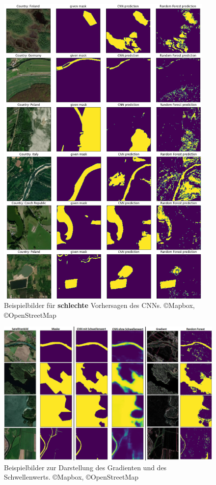 \begin{figure}
    \centering
    \caption{Beispielbilder für \textbf{schlechte} Vorhersagen des CNNs. \copyright Mapbox, \copyright OpenStreetMap}
    \label{fig:ergebnisse_schlecht}
    \includegraphics[width=0.95\textwidth]{content/img/ergebnisse_schlecht.png}
\end{figure}

\begin{figure}
    \centering
    \caption{Beispielbilder zur Darstellung des Gradienten und des Schwellenwerts. \copyright Mapbox, \copyright OpenStreetMap}
    \label{fig:gradient_schwellenwert}
    \includegraphics[width=\textwidth]{content/img/gradient_threshold.png}
\end{figure}